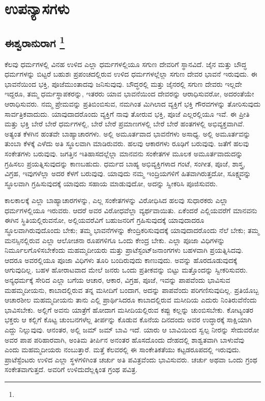 

\part{ಉಪನ್ಯಾಸಗಳು}

\mainmatter

\chapter[ಈಶ್ವರಾನುರಾಗ]{ಈಶ್ವರಾನುರಾಗ \protect\footnote{}}

ಕೆಲವು ಧರ್ಮಗಳಲ್ಲಿ ವಿನಹ ಉಳಿದ ಎಲ್ಲಾ ಧರ್ಮಗಳಲ್ಲಿಯೂ ಸಗುಣ ದೇವರಿಗೆ ಸ್ಥಾನವಿದೆ. ಜೈನ ಮತ್ತು ಬೌದ್ಧ ಧರ್ಮಗಳನ್ನು ಬಿಟ್ಟರೆ ಬಹುಶಃ ಪ್ರಪಂಚದಲ್ಲಿರುವ ಉಳಿದ ಧರ್ಮಗಳಲ್ಲೆಲ್ಲಾ ಸಗುಣ ದೇವರ ಭಾವನೆ ಇರುವುದು. ಈ ಭಾವನೆಯಿಂದ ಭಕ್ತಿ, ಪೂಜೆ\break ಮುಂತಾದವು ಜನಿಸುವುವು. ಬೌದ್ಧರಲ್ಲಿ ಮತ್ತು ಜೈನರಲ್ಲಿ ಸಗುಣ ದೇವರು ಇಲ್ಲದೇ ಇದ್ದರೂ, ತಮ್ಮ ಧರ್ಮಸ್ಥಾಪಕರನ್ನು, ಇತರರು ಯಾವ ಭಾವನೆಯಿಂದ ದೇವರನ್ನು ಆರಾಧಿಸುವರೋ, ಅದರಂತೆಯೇ ಆರಾಧಿಸುವರು. ನಮ್ಮ ಪ್ರೇಮವನ್ನು ಪ್ರತಿಬಿಂಬಿಸುವ, ನಮಗಿಂತ ಮಿಗಿಲಾದ ವ್ಯಕ್ತಿಗೆ ಭಕ್ತಿ ಗೌರವಗಳನ್ನು ತೋರಿಸುವುದು ಸಾರ್ವತ್ರಿಕ\-ವಾದುದು. ಯಾವುದಾದರೊಂದು ವ್ಯಕ್ತಿಗೆ ನಾವು ತೋರುವ ಭಕ್ತಿ, ಪೂಜೆ ಎಲ್ಲರಲ್ಲಿಯೂ ಇವೆ. ಈ ಪ್ರೀತಿ ಮತ್ತು ಭಕ್ತಿ ಬೇರೆ ಬೇರೆ ಧರ್ಮಗಳಲ್ಲಿ, ಬೇರೆ ಬೇರೆ ಪ್ರಮಾಣಗಳಲ್ಲಿ ಬೇರೆ ಬೇರೆ ಹಂತಗಳಲ್ಲಿ ಅಭಿವ್ಯಕ್ತವಾಗಿವೆ. ಅತ್ಯಂತ ಕೆಳಗಿನ ಹಂತವೇ ಬಾಹ್ಯಾಚಾರಗಳು. ಅಲ್ಲಿ ಅಮೂರ್ತವಾದ ಭಾವನೆಗಳು ಅಸಾಧ್ಯ. ಅಲ್ಲಿ ಅಮೂರ್ತವನ್ನು ತುಂಬಾ ಕೆಳಕ್ಕೆ ಎಳೆದು ಅತಿ ಸ್ಥೂಲವಾಗಿ ಮಾಡಿರುವರು. ಹಲವು ಆಕಾರಗಳು ರೂಢಿಗೆ ಬರುವುವು. ಜತೆಗೆ ಹಲವು ಸಂಕೇತಗಳು ಬರುವುವು. ಜಗತ್ತಿನ ಇತಿಹಾಸದಲ್ಲೆಲ್ಲಾ ಮಾನವನು ಸಂಕೇತಗಳ ಮೂಲಕ ಅಮೂರ್ತವಾದುದನ್ನು ಗ್ರಹಿಸಲು ಪ್ರಯತ್ನಿಸುವುದನ್ನು ಕಾಣಬಹುದು. ಧರ್ಮದ ಬಾಹ್ಯ ಅಭಿವ್ಯಕ್ತಿಗಳಾದ ಗಂಟೆ, ಸಂಗೀತ, ಪೂಜೆ, ಶಾಸ್ತ್ರ, ವಿಗ್ರಹ, ಇವುಗಳೆಲ್ಲಾ ಅದರ ಕೆಳಗೆ ಬರುವುವು. ಯಾವುದು ನಮ್ಮ ಇಂದ್ರಿಯಗಳಿಗೆ ಹಿತವಾಗಿರುತ್ತದೋ, ಸೂಕ್ಷ್ಮವನ್ನು ಸ್ಥೂಲವಾಗಿ ಗ್ರಹಿಸುವುದಕ್ಕೆ ಯಾವುದು ಸಹಾಯ ಮಾಡುವುದೋ, ಅದನ್ನು ಸ್ವೀಕರಿಸಿ ಪೂಜಿಸುವರು.

ಕಾಲಕಾಲಕ್ಕೆ ಎಲ್ಲಾ ಬಾಹ್ಯಾಚಾರಗಳನ್ನು, ಎಲ್ಲ ಸಂಕೇತಗಳನ್ನು ವಿರೋಧಿಸಿದ ಹಲವು ಸುಧಾರಕರು ಎಲ್ಲಾ ಧರ್ಮಗಳಲ್ಲಿಯೂ ಇರುವರು. ಆದರೆ ಅವರ ವಿರೋಧವೆಲ್ಲಾ ವ್ಯರ್ಥವಾಯಿತು. ಏಕೆಂದರೆ ಎಲ್ಲಿಯವರೆಗೆ ಮಾನವನು ಈಗಿನ ಸ್ಥಿತಿಯಲ್ಲಿರುವನೋ, ಅಲ್ಲಿಯ\-ವರೆವಿಗೆ ಬಹುಜನರಿಗೆ ಗ್ರಹಿಸುವುದಕ್ಕೆ ಯಾವುದಾದರೂ ಸ್ಥೂಲವಾಗಿರುವುದೊಂದು ಬೇಕು; ತಮ್ಮ ಭಾವನೆಗಳನ್ನು ಕೇಂದ್ರಿಕರಿಸುವುದಕ್ಕೆ ಯಾವುದಾದರೊಂದು ನೆಲೆ ಬೇಕು; ತಮ್ಮ ಮನಸ್ಸಿನಲ್ಲಿರುವ ಎಲ್ಲಾ ಆಲೋಚನಾ ರೂಪಗಳಿಗೂ ಒಂದು ಕೇಂದ್ರ ಬೇಕು. ಎಲ್ಲಾ ಪೂಜಾ ವಿಧಿಗಳನ್ನು ನಿರ್ಮೂಲಗೊಳಿಸಬೇಕೆಂದು ಮಹಮ್ಮದೀಯರು ಮತ್ತು ಪ್ರಾಟೆಸ್ಟಂಟ್​\break ಜನಾಂಗಗಳು ಬಹಳವಾಗಿ ಪ್ರಯತ್ನಿಸಿದವು. ಆದರೂ ಅವರಲ್ಲಿಯೂ ಪೂಜಾ ವಿಧಿಗಳು ತೂರಿ ಬಂದಿರುವುದು ಕಾಣುವುದು. ಅವನ್ನು ಹೊರದೂಡುವುದಕ್ಕೆ ಆಗುವುದಿಲ್ಲ. ಬಹಳ ಹೋರಾಟವಾದ ಮೇಲೆ ಜನರು ಒಂದು ಪ್ರತೀಕವನ್ನು ಬಿಟ್ಟು ಮತ್ತೊಂದನ್ನು ಸ್ವೀಕರಿಸುವರು. ಅನ್ಯಧರ್ಮಕ್ಕೆ ಸೇರಿದ ಎಲ್ಲಾ ಬಗೆಯ ಆಚಾರ, ಆಕಾರ, ವಿಗ್ರಹ, ಪೂಜೆ, ಇವನ್ನು ಪಾಪವೆಂದು ಭಾವಿಸುವ ಮಹಮ್ಮದೀಯನು, ಕಾಬಾದಲ್ಲಿರುವ ತನ್ನ ಮಸೀದಿಗೆ ಬಂದಾಗ, ಅದನ್ನು ಪಾಪವೆಂದು ಪರಿಗಣಿಸುವುದಿಲ್ಲ. ಪ್ರತಿಯೊಬ್ಬ ಆಚಾರಶೀಲ ಮಹಮ್ಮದೀಯನು ತಾನು ಎಲ್ಲಿ ಪ್ರಾರ್ಥಿಸಿದರೂ ಕಾಬಾದಲ್ಲಿರುವ ಮಸೀದಿಯ ಎದುರು ನಿಂತಿರುವೆನೆಂದು ಭಾವಿಸಬೇಕು. ಅಲ್ಲಿಗೆ ಅವನು ಯಾತ್ರೆಗೆ ಹೋದಾಗ ಮಸೀದಿಯಲ್ಲಿರುವ ಕಪ್ಪು ಕಲ್ಲನ್ನು ಚುಂಬಿಸಬೇಕು. ಕೋಟ್ಯಂತರ ಭಕ್ತರು ಆ ಕಲ್ಲಿಗೆ ಕೊಟ್ಟ ಚುಂಬನಗಳೆಲ್ಲ ತೀರ್ಪನ್ನು ಕೊಡುವ ಕೊನೆಯ ದಿನದಂದು ಅವರ ಉದ್ಧಾರಕ್ಕೆ ಸಾಕ್ಷಿಯಾಗಿ ಎದ್ದು ನಿಲ್ಲುವುವು. ಆನಂತರ, ಅಲ್ಲಿ ಜಮ್​ ಜಮ್​ ಬಾವಿ ಇದೆ. ಯಾರು ಆ ಬಾವಿಯಿಂದ ಸ್ವಲ್ಪ ನೀರನ್ನು ಸೇದುವರೋ ಅವರ ಪಾಪ ಪರಿಹಾರವಾಗಿ, ಅಂತಿಮ ತೀರ್ಪಿನ ಅನಂತರ ಹೊಸದೊಂದು ದೇಹದಲ್ಲಿ ಶಾಶ್ವತವಾಗಿ ಬಾಳುವೆವು ಎಂದು ಮಹಮ್ಮದೀಯರು ನಂಬುತ್ತಾರೆ. ಮತ್ತೆ ಕೆಲವರಲ್ಲಿ ಈ ಸಾಂಕೇತಿಕತೆಯು ಕಟ್ಟಡರೂಪದಲ್ಲಿ ಇರುವುದು. ಪ್ರಾಟೆಸ್ಟೆಂಟರು ಉಳಿದ ಎಲ್ಲಾ ಸ್ಥಳಗಳಿಗಿಂತ ಚರ್ಚು ಅತಿ ಪವಿತ್ರವೆಂದು ಭಾವಿಸುವರು. ಚರ್ಚು ಅಥವಾ ಒಂದು ಗ್ರಂಥ ಸಂಕೇತವಾಗುತ್ತದೆ. ಅವರಿಗೆ ಉಳಿದುದೆಲ್ಲಕ್ಕಿಂತ ಗ್ರಂಥ ಪವಿತ್ರ.


